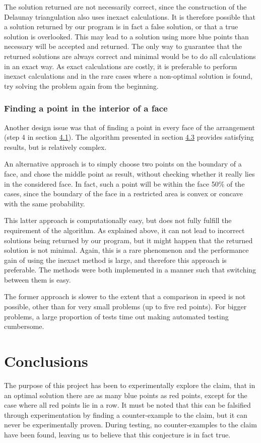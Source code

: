\documentclass[a4paper,12pt]{article}
\begin{document}
The solution returned are not necessarily correct, since the construction of the Delaunay triangulation also uses inexact calculations. It is therefore possible that a solution returned by our program is in fact a false solution, or that a true solution is overlooked. This may lead to a solution using more blue points than necessary will be accepted and returned. The only way to guarantee that the returned solutions are always correct and minimal would be to do all calculations in an exact way. As exact calculations are costly, it is preferable to perform inexact calculations and in the rare cases where a non-optimal solution is found, try solving the problem again from the beginning.

\subsubsection{Finding a point in the interior of a face}

Another design issue was that of finding a point in every face of the arrangement (step 4 in section \hyperref[ref:Algorithm]{4.1}). The algorithm presented in section \hyperref[sec:findPoints]{4.3} provides satisfying results, but is relatively complex.

An alternative approach is to simply choose two points on the boundary of a face, and chose the middle point as result, without checking whether it really lies in the considered face. In fact, such a point will be within the face 50\% of the cases, since the boundary of the face in a restricted area is convex or concave with the same probability. 

This latter approach is computationally easy, but does not fully fulfill the requirement of the algorithm. As explained above, it can not lead to incorrect solutions being returned by our program, but it might happen that the returned solution is not minimal. Again, this is a rare phenomenon and the performance gain of using the inexact method is large, and therefore this approach is preferable. The methods were both implemented in a manner such that switching between them is easy.

The former approach is slower to the extent that a comparison in speed is not possible, other than for very small problems (up to five red points). For bigger problems, a large proportion of tests time out making automated testing cumbersome.


\section{Conclusions}
The purpose of this project has been to experimentally explore the claim, that in an optimal solution there are as many blue points as red points, except for the case where all red points lie in a row. It must be noted that this can be falsified through experimentation by finding a counter-example to the claim, but it can never be experimentally proven. During testing, no counter-examples to the claim have been found, leaving us to believe that this conjecture is in fact true.
\end{document}
